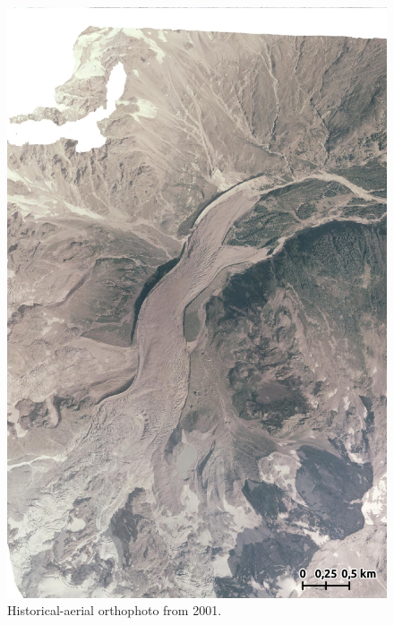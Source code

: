 \begin{figure}[p]
    \centering
    \includegraphics[height=\textheight]{figures/appendix/orto_2001.jpg}
    \caption[]{Historical-aerial orthophoto from 2001.}
\end{figure}

